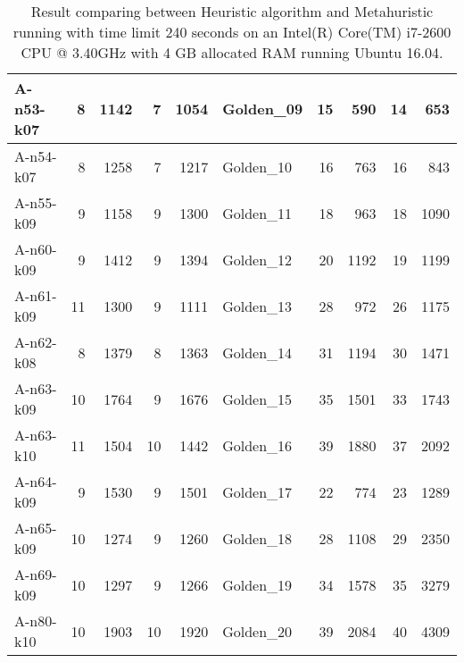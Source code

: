 \begin{table}[!h]
\begin{center}
\begin{tabular}{|l|r|r|r|r|l|r|r|r|r|}
    A-n53-k07 & 8 & 1142 & 7 & 1054 & Golden\_09 & 15 & 590 & 14 & 653 \\ \hline
    A-n54-k07 & 8 & 1258 & 7 & 1217 & Golden\_10 & 16 & 763 & 16 & 843 \\ \hline
    A-n55-k09 & 9 & 1158 & 9 & 1300 & Golden\_11 & 18 & 963 & 18 & 1090 \\ \hline
    A-n60-k09 & 9 & 1412 & 9 & 1394 & Golden\_12 & 20 & 1192 & 19 & 1199 \\ \hline
    A-n61-k09 & 11 & 1300 & 9 & 1111 & Golden\_13 & 28 & 972 & 26 & 1175 \\ \hline
    A-n62-k08 & 8 & 1379 & 8 & 1363 & Golden\_14 & 31 & 1194 & 30 & 1471 \\ \hline
    A-n63-k09 & 10 & 1764 & 9 & 1676 & Golden\_15 & 35 & 1501 & 33 & 1743 \\ \hline
    A-n63-k10 & 11 & 1504 & 10 & 1442 & Golden\_16 & 39 & 1880 & 37 & 2092 \\ \hline
    A-n64-k09 & 9 & 1530 & 9 & 1501 & Golden\_17 & 22 & 774 & 23 & 1289 \\ \hline
    A-n65-k09 & 10 & 1274 & 9 & 1260 & Golden\_18 & 28 & 1108 & 29 & 2350 \\ \hline
    A-n69-k09 & 10 & 1297 & 9 & 1266 & Golden\_19 & 34 & 1578 & 35 & 3279 \\ \hline
    A-n80-k10 & 10 & 1903 & 10 & 1920 & Golden\_20 & 39 & 2084 & 40 & 4309 \\ \hline
    \end{tabular}
    \end{center}
    \caption{Result comparing between Heuristic algorithm and  Metahuristic running with time limit 240 seconds on an Intel(R) Core(TM) i7-2600 CPU @ 3.40GHz with 4 GB allocated RAM running Ubuntu 16.04.}
    \label{table:cost}
    \end{table}
    